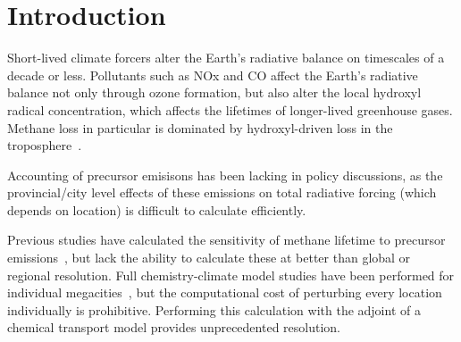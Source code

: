 \section{Introduction}

Short-lived climate forcers alter the Earth's radiative balance on timescales of a decade or less. Pollutants such as NOx and CO affect the Earth's radiative balance not only through ozone formation, but also alter the local hydroxyl radical concentration, which affects the lifetimes of longer-lived greenhouse gases. Methane loss in particular is dominated by hydroxyl-driven loss in the troposphere~\citep{ref:kirschke2013}.

Accounting of precursor emisisons has been lacking in policy discussions, as the provincial/city level effects of these emissions on total radiative forcing (which depends on location) is difficult to calculate efficiently.

Previous studies have calculated the sensitivity of methane lifetime to precursor emissions~\citep{ref:holmes2013}, but lack the ability to calculate these at better than global or regional resolution. Full chemistry-climate model studies have been performed for individual megacities~\citep{ref:dang2015}, but the computational cost of perturbing every location individually is prohibitive. Performing this calculation with the adjoint of a chemical transport model provides unprecedented resolution.